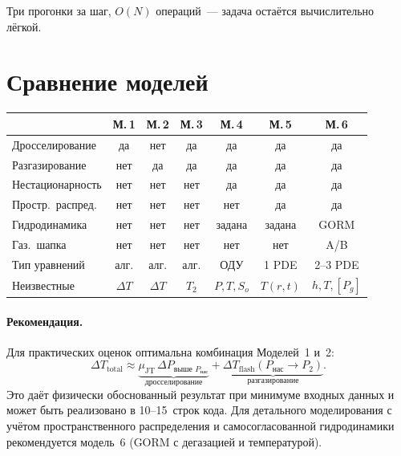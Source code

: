\documentclass[12pt,a4paper]{article}
\begin{document}
Три прогонки за шаг, $O(N)$ операций~--- задача остаётся
вычислительно лёгкой.

\section{Сравнение моделей}

\begin{center}
\renewcommand{\arraystretch}{1.3}
\begin{tabular}{|l|c|c|c|c|c|c|}
  \hline
  & \textbf{М.\,1} & \textbf{М.\,2} & \textbf{М.\,3}
  & \textbf{М.\,4} & \textbf{М.\,5} & \textbf{М.\,6} \\
  \hline
  Дросселирование    & да  & нет & да  & да  & да  & да \\
  Разгазирование     & нет & да  & да  & да  & да  & да \\
  Нестационарность   & нет & нет & нет & да  & да  & да \\
  Простр.\ распред.  & нет & нет & нет & нет & да  & да \\
  Гидродинамика      & нет & нет & нет & задана & задана & GORM \\
  Газ.\ шапка        & нет & нет & нет & нет & нет & A/B \\
  Тип уравнений      & алг. & алг. & алг. & ОДУ & 1 PDE & 2--3 PDE \\
  Неизвестные        & $\Delta T$ & $\Delta T$ & $T_2$
    & $P,T,S_o$ & $T(r,t)$ & $h, T, [P_g]$ \\
  \hline
\end{tabular}
\end{center}

\paragraph{Рекомендация.}
Для практических оценок оптимальна комбинация Моделей~1 и~2:
\begin{equation}\label{eq:combined}
  \Delta T_{\mathrm{total}} \approx
    \underbrace{\mu_{\mathrm{JT}}\,\Delta P_{\text{выше } P_{\text{нас}}}}_{\text{дросселирование}}
  + \underbrace{\Delta T_{\mathrm{flash}}(P_{\text{нас}} \to P_2)}_{\text{разгазирование}}.
\end{equation}
Это даёт физически обоснованный результат при минимуме входных данных
и может быть реализовано в 10--15~строк кода.
Для детального моделирования с учётом пространственного распределения
и самосогласованной гидродинамики рекомендуется модель~6 (GORM с
дегазацией и температурой).
\end{document}
